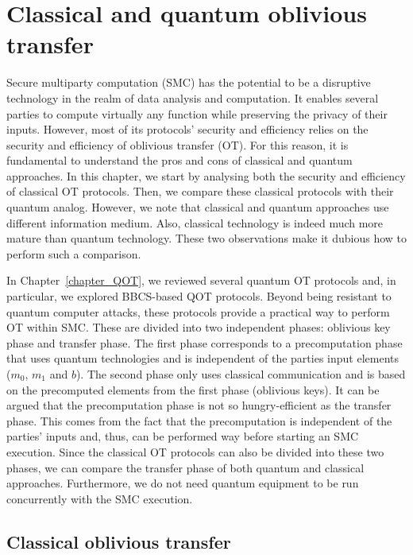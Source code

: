 


%

\chapter{Classical and quantum oblivious transfer}
\label{classical-and-quantum-OT}

Secure multiparty computation (SMC) has the potential to be a disruptive technology in the realm of data analysis and computation. It enables several parties to compute virtually any function while preserving the privacy of their inputs. However, most of its protocols’ security and efficiency relies on the security and efficiency of oblivious transfer (OT). For this reason, it is fundamental to understand the pros and cons of classical and quantum approaches. In this chapter, we start by analysing both the security and efficiency of classical OT protocols. Then, we compare these classical protocols with their quantum analog. However, we note that classical and quantum approaches use different information medium. Also, classical technology is indeed much more mature than quantum technology. These two observations make it dubious how to perform such a comparison. 

In Chapter~\ref{chapter_QOT}, we reviewed several quantum OT protocols and, in particular, we explored BBCS-based QOT protocols. Beyond being resistant to quantum computer attacks, these protocols provide a practical way to perform OT within SMC. These are divided into two independent phases: oblivious key phase and transfer phase. The first phase corresponds to a precomputation phase that uses quantum technologies and is independent of the parties input elements ($m_0$, $m_1$ and $b$). The second phase only uses classical communication and is based on the precomputed elements from the first phase (oblivious keys). It can be argued that the precomputation phase is not so hungry-efficient as the transfer phase. This comes from the fact that the precomputation is independent of the parties' inputs and, thus, can be performed way before starting an SMC execution. Since the classical OT protocols can also be divided into these two phases, we can compare the transfer phase of both quantum and classical approaches. Furthermore, we do not need quantum equipment to be run concurrently with the SMC execution.


\section{Classical oblivious transfer}\label{Classical-OT}


